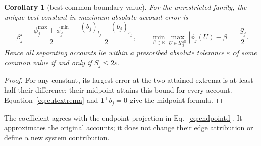 \documentclass[a4paper,fleqn]{cas-sc}
\newtheorem{corollary}[theorem]{Corollary}
\begin{document}
\begin{corollary}[best common boundary value]\label{cor:approxinterchange}
For the unrestricted family, the unique best constant in maximum absolute
account error is
\[
\beta_j^\star=\frac{\phi_j^{\max}+\phi_j^{\min}}2
=\frac{(b_j)_{t_j}-(b_j)_{s_j}}2,\qquad
\min_{\beta\in\mathbb R}\max_{U\in\mathcal U_j^{\mathrm{all}}}
|\phi_j(U)-\beta|=\frac{S_j}{2}.
\]
Hence all separating accounts lie within a prescribed absolute tolerance
$\varepsilon$ of some common value if and only if $S_j\le2\varepsilon$.
\end{corollary}
\begin{proof}
For any constant, its largest error at the two attained extrema is at least
half their difference; their midpoint attains this bound for every account.
Equation~\eqref{eq:cutextrema} and $\mathbf1^\top b_j=0$ give the midpoint formula.
\end{proof}
The coefficient agrees with the endpoint projection in
Eq.~\eqref{eq:endpointd}. It approximates the original accounts; it does
not change their edge attribution or define a new system contribution.
\end{document}
